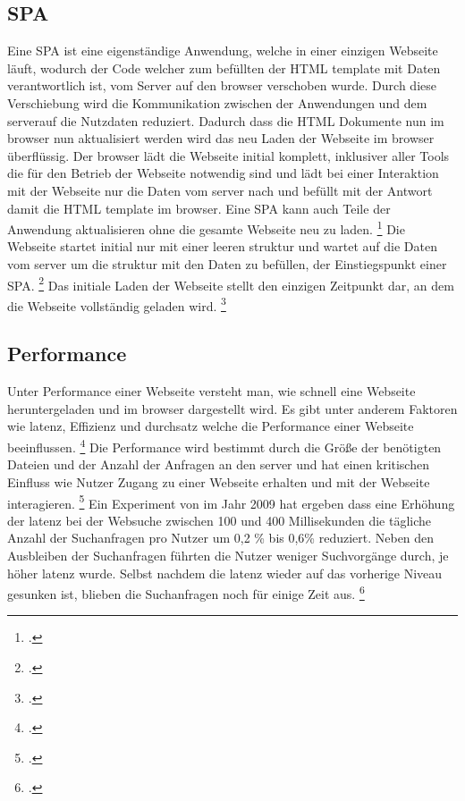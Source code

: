 \subsection{\ac{SPA}}
Eine \ac{SPA} ist eine eigenständige Anwendung, welche in einer einzigen Webseite läuft, wodurch der Code welcher zum befüllten der \ac{HTML} \gls{template}
mit Daten verantwortlich ist, vom Server auf den \gls{browser} verschoben wurde.
Durch diese Verschiebung wird die Kommunikation zwischen der Anwendungen und dem \gls{server}auf die Nutzdaten reduziert.
Dadurch dass die \ac{HTML} Dokumente nun im \gls{browser} nun aktualisiert werden wird das neu Laden der Webseite im \gls{browser} überflüssig.
Der \gls{browser} lädt die Webseite initial komplett, inklusiver aller Tools die für den Betrieb der Webseite notwendig sind und lädt bei einer Interaktion mit der Webseite nur die Daten vom \gls{server} nach und befüllt mit der Antwort damit die \ac{HTML} \gls{template} im \gls{browser}.
Eine \ac{SPA} kann auch Teile der Anwendung aktualisieren ohne die gesamte Webseite neu zu laden. \footcite[Vgl.][Seite 14]{Flanagan2011}
Die Webseite startet initial nur mit einer leeren \gls{struktur} und wartet auf die Daten vom \gls{server} um die \gls{struktur} mit den Daten zu befüllen, der Einstiegspunkt einer \ac{SPA}. \footcite[Vgl.][Seite 23]{Doguhan2020}
Das initiale Laden der Webseite stellt den einzigen Zeitpunkt dar, an dem die Webseite vollständig geladen wird. \footcite[Vgl.][Seite 4 - 8]{Scott2015}

\subsection{Performance}
Unter Performance einer Webseite versteht man, wie schnell eine Webseite heruntergeladen und im \gls{browser} dargestellt wird.
Es gibt unter anderem Faktoren wie \gls{latenz}, Effizienz und \gls{durchsatz} welche die Performance einer Webseite beeinflussen. \footcite[Vgl.][Seite 53]{Killelea2002}
Die Performance wird bestimmt durch die Größe der benötigten Dateien und der Anzahl der Anfragen an den \gls{server}
und hat einen kritischen Einfluss wie Nutzer Zugang zu einer Webseite erhalten und mit der Webseite interagieren. \footcite[Vgl.][Seite 44]{Robbins2018}
Ein Experiment von  im Jahr 2009 hat ergeben dass eine Erhöhung der \gls{latenz} bei der Websuche zwischen 100 und 400 Millisekunden die tägliche
Anzahl der Suchanfragen pro Nutzer um 0,2 \% bis 0,6\% reduziert.
Neben den Ausbleiben der Suchanfragen führten die Nutzer weniger Suchvorgänge durch, je höher \gls{latenz} wurde.
Selbst nachdem die \gls{latenz} wieder auf das vorherige Niveau gesunken ist, blieben die Suchanfragen noch für einige Zeit aus. \footcite[Vgl.][Seite 1]{Google2009}

